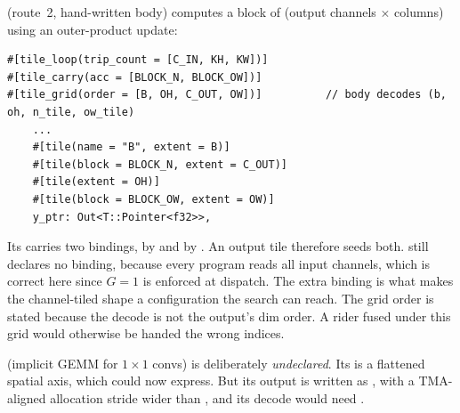  (route~2, hand-written body) computes a
 block of (output channels $\times$ columns) using an
outer-product update:

\begin{lstlisting}
#[tile_loop(trip_count = [C_IN, KH, KW])]
#[tile_carry(acc = [BLOCK_N, BLOCK_OW])]
#[tile_grid(order = [B, OH, C_OUT, OW])]          // body decodes (b, oh, n_tile, ow_tile)
    ...
    #[tile(name = "B", extent = B)]
    #[tile(block = BLOCK_N, extent = C_OUT)]
    #[tile(extent = OH)]
    #[tile(block = BLOCK_OW, extent = OW)]
    y_ptr: Out<T::Pointer<f32>>,
\end{lstlisting}

Its  carries two bindings,  by  and  by
. An output tile \code{[_, 32, _, 16]} therefore seeds both. 
still declares no  binding, because every program reads all input
channels, which is correct here since $G=1$ is enforced at dispatch. The extra
binding is what makes the channel-tiled shape a configuration the search can reach.
The grid order is stated because the decode is not the output's dim order. A rider
fused under this grid would otherwise be handed the wrong indices.

 (implicit GEMM for $1\times1$ convs) is
deliberately \emph{undeclared}. Its  is a flattened spatial axis,
which  could now express. But its output is written as
, with a TMA-aligned allocation stride wider than
, and its  decode would need .
